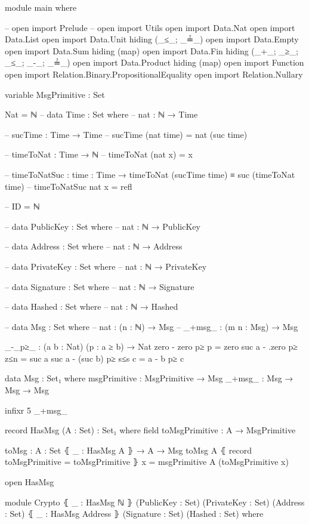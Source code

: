\documentclass{beamer}
\begin{document}
\begin{code}
module main where


-- open import Prelude
-- open import Utils
open import Data.Nat
open import Data.List
open import Data.Unit hiding (_≤_; _≟_)
open import Data.Empty
open import Data.Sum hiding (map)
open import Data.Fin hiding (_+_; _≥_; _≤_; _-_; _≟_)
open import Data.Product hiding (map)
open import Function
open import Relation.Binary.PropositionalEquality
open import Relation.Nullary

variable
  MsgPrimitive : Set

Nat = ℕ
-- data Time : Set where
--   nat : ℕ → Time

-- sucTime : Time → Time
-- sucTime (nat time) = nat (suc time)

-- timeToNat : Time → ℕ
-- timeToNat (nat x) = x

-- timeToNatSuc : {time : Time} → timeToNat (sucTime time) ≡ suc (timeToNat time)
-- timeToNatSuc {nat x} = refl

-- ID = ℕ

-- data PublicKey : Set where
--   nat : ℕ → PublicKey

-- data Address : Set where
--   nat : ℕ → Address

-- data PrivateKey : Set where
--   nat : ℕ → PrivateKey

-- data Signature : Set where
--   nat : ℕ → Signature

-- data Hashed : Set where
--   nat : ℕ → Hashed

-- data Msg : Set where
--   nat : (n : ℕ) → Msg
--   _+msg_ : (m n : Msg) → Msg



_-_p≥_ : (a b : Nat) (p : a ≥ b) → Nat
zero - zero p≥ p = zero
suc a - .zero p≥ z≤n = suc a
suc a - (suc b) p≥ s≤s c = a - b p≥ c

data Msg : Set₁ where
  msgPrimitive : MsgPrimitive → Msg
  _+msg_ : Msg → Msg → Msg

infixr 5 _+msg_

record HasMsg (A : Set) : Set₁ where
  field
    toMsgPrimitive : A → MsgPrimitive

toMsg : {A : Set} ⦃ _ : HasMsg A ⦄ → A → Msg
toMsg {A} ⦃ record { toMsgPrimitive = toMsgPrimitive } ⦄ x = msgPrimitive {A} (toMsgPrimitive x)

open HasMsg

module Crypto
  ⦃ _ : HasMsg ℕ ⦄
  (PublicKey : Set)
  (PrivateKey : Set)
  (Address : Set)
  ⦃ _ : HasMsg Address ⦄
  (Signature : Set)
  (Hashed : Set)
  where


\end{code}
\end{document}
